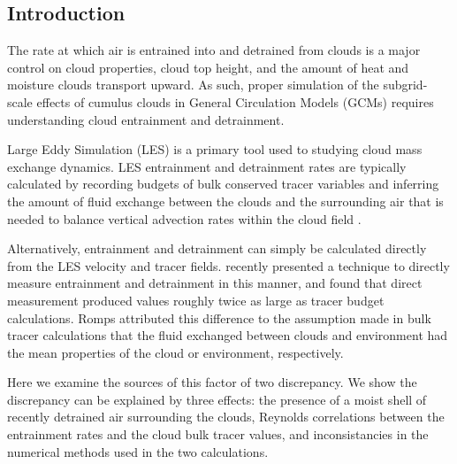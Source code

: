 \documentclass[draft,grl]{agutex}
\begin{document}
%

\begin{article}

%
%

\section{Introduction}

The rate at which air is entrained into and detrained from clouds is a major 
control on cloud properties, cloud top height, and the amount of heat and 
moisture clouds transport upward.  As such, proper simulation of the 
subgrid-scale effects of cumulus clouds in General Circulation Models (GCMs) 
requires understanding cloud entrainment and detrainment.

Large Eddy Simulation (LES) is a primary tool used to studying cloud mass
exchange dynamics.  LES entrainment and detrainment rates are typically 
calculated by recording budgets of bulk conserved tracer variables and 
inferring the amount of fluid exchange between the clouds and the surrounding 
air that is needed to balance vertical advection rates within the cloud field 
\citep{Siebesma1995}.

Alternatively, entrainment and detrainment can simply be calculated directly 
from the LES velocity and tracer fields.  \cite{Romps2010} recently presented 
a technique to directly measure entrainment and detrainment in this manner, 
and found that direct measurement produced values roughly twice as large as 
tracer budget calculations.  Romps attributed this difference to the assumption 
made in bulk tracer calculations that the fluid exchanged between clouds and 
environment had the mean properties of the cloud or environment, respectively.

Here we examine the sources of this factor of two discrepancy.  We show the 
discrepancy can be explained by three effects: the presence of a moist shell 
of recently detrained air surrounding the clouds, Reynolds correlations 
between the entrainment rates and the cloud bulk tracer values, and 
inconsistancies in the numerical methods used in the two calculations.


\end{article}
\end{document}
